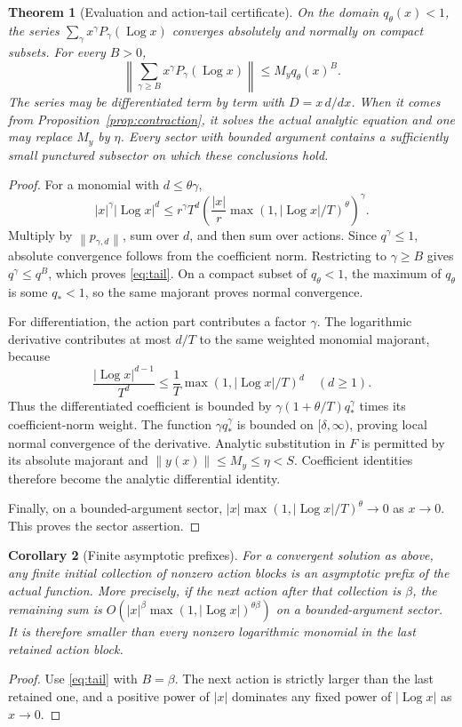 \documentclass[11pt,a4paper]{article}
\numberwithin{equation}{section}
\newtheorem{theorem}{Theorem}[section]
\newtheorem{corollary}[theorem]{Corollary}
\theoremstyle{definition}
\theoremstyle{remark}
\newcommand{\norm}[1]{\left\lVert #1\right\rVert}
\newcommand{\Log}{\operatorname{Log}}
\begin{document}
\begin{theorem}[Evaluation and action-tail certificate]
\label{thm:remainder}
On the domain \(q_\theta(x)<1\), the series
\(\sum_\gamma x^\gamma P_\gamma(\Log x)\) converges absolutely and
normally on compact subsets. For every \(B>0\),
\begin{equation}\label{eq:tail}
 \boxed{\displaystyle
 \norm{\sum_{\gamma\ge B}x^\gamma P_\gamma(\Log x)}
       \le M_y q_\theta(x)^B.}
\end{equation}
The series may be differentiated term by term with \(D=x\,d/dx\).
When it comes from Proposition~\ref{prop:contraction}, it solves the
actual analytic equation and one may replace \(M_y\) by \(\eta\).
Every sector with bounded argument contains a sufficiently small
punctured subsector on which these conclusions hold.
\end{theorem}
\begin{proof}
For a monomial with \(d\le\theta\gamma\),
\[
 |x|^\gamma|\Log x|^d
 \le r^\gamma T^d
   \left(\frac{|x|}{r}
       \max(1,|\Log x|/T)^\theta\right)^\gamma.
\]
Multiply by \(\norm{p_{\gamma,d}}\), sum over \(d\), and then sum
over actions. Since \(q^\gamma\le1\), absolute convergence follows
from the coefficient norm. Restricting to \(\gamma\ge B\) gives
\(q^\gamma\le q^B\), which proves \eqref{eq:tail}.
On a compact subset of \(q_\theta<1\), the maximum of \(q_\theta\)
is some \(q_*<1\), so the same majorant proves normal convergence.

For differentiation, the action part contributes a factor \(\gamma\).
The logarithmic derivative contributes at most \(d/T\) to the same
weighted monomial majorant, because
\[
 \frac{|\Log x|^{d-1}}{T^d}
 \le\frac1T\max(1,|\Log x|/T)^d
 \quad(d\ge1).
\]
Thus the differentiated coefficient is bounded by
\(\gamma(1+\theta/T)q_*^\gamma\) times its coefficient-norm weight.
The function \(\gamma q_*^\gamma\) is bounded on
\([\delta,\infty)\), proving local normal convergence of the
derivative. Analytic substitution in \(F\) is permitted by its
absolute majorant and \(\norm{y(x)}\le M_y\le\eta<S\).
Coefficient identities therefore become the analytic differential
identity.

Finally, on a bounded-argument sector,
\(|x|\max(1,|\Log x|/T)^\theta\to0\) as \(x\to0\).
This proves the sector assertion.
\end{proof}

\begin{corollary}[Finite asymptotic prefixes]\label{cor:prefix}
For a convergent solution as above, any finite initial collection of
nonzero action blocks is an asymptotic prefix of the actual function.
More precisely, if the next action after that collection is \(\beta\),
the remaining sum is
\(O(|x|^\beta\max(1,|\Log x|)^ {\theta\beta})\)
on a bounded-argument sector. It is therefore smaller than every
nonzero logarithmic monomial in the last retained action block.
\end{corollary}
\begin{proof}
Use \eqref{eq:tail} with \(B=\beta\). The next action is strictly
larger than the last retained one, and a positive power of \(|x|\)
dominates any fixed power of \(|\Log x|\) as \(x\to0\).
\end{proof}
\end{document}
